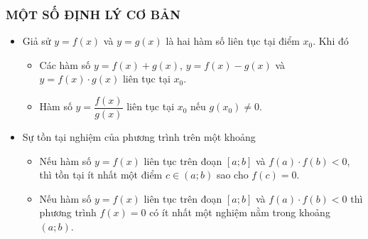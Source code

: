 \subsubsection{MỘT SỐ ĐỊNH LÝ CƠ BẢN}
\begin{itemize}
	\item [\iconMT]  Giả sử $y=f(x)$ và $y=g(x)$ là hai hàm số liên tục tại điểm $x_0$. Khi đó
	\begin{gachsoc}
		\begin{itemize}
			\item Các hàm số $y=f(x)+g(x)$, $y=f(x)-g(x)$ và $y=f(x)\cdot g(x)$ liên tục tại $x_0$.
			\item Hàm số $y=\dfrac{f(x)}{g(x)}$ liên tục tại $x_0$ nếu $g(x_0)\neq 0$.
		\end{itemize}
	\end{gachsoc}
	\item [\iconMT]  Sự tồn tại nghiệm của phương trình trên một khoảng
	\begin{gachsoc}
		\begin{itemize}
			\item Nếu hàm số $y=f(x)$ liên tục trên đoạn $[a;b]$ và $f(a) \cdot f(b)<0$, thì tồn tại ít nhất một điểm $c\in (a;b)$ sao cho $f(c)=0$.
			\item Nếu hàm số $y=f(x)$ liên tục trên đoạn $[a;b]$ và $f(a)\cdot f(b)<0$ thì phương trình $f(x)=0$ có ít nhất một nghiệm nằm trong khoảng $(a;b)$.
		\end{itemize}
	\end{gachsoc}
\end{itemize}
